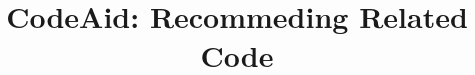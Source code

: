 \documentclass[conference]{IEEEtran}
\begin{document}
\newcommand\todo[1]{\textcolor{red}{TODO: #1}}

\title{CodeAid: Recommeding Related Code
}


\maketitle
\end{document}
